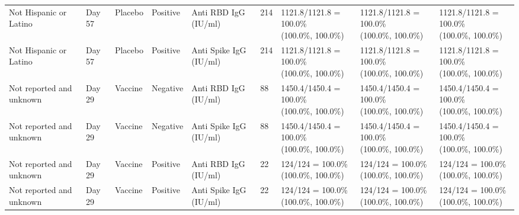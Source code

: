 \documentclass[]{book}
\theoremstyle{definition}
\theoremstyle{definition}
\theoremstyle{definition}
\newcommand{\1}{\mathbbm{1}}
\begin{document}
\begin{landscape}
\begin{ThreePartTable}
\begin{longtable}[t]{>{\raggedright\arraybackslash}p{2.7cm}llllllll}
\hspace{1em}Not Hispanic or Latino & Day 57 & Placebo & Positive & Anti RBD IgG (IU/ml) & 214 & \makecell[l]{1121.8/1121.8 = 100.0\%\\(100.0\%, 100.0\%)} & \makecell[l]{1121.8/1121.8 = 100.0\%\\(100.0\%, 100.0\%)} & \makecell[l]{1121.8/1121.8 = 100.0\%\\(100.0\%, 100.0\%)}\\
\hspace{1em}Not Hispanic or Latino & Day 57 & Placebo & Positive & Anti Spike IgG (IU/ml) & 214 & \makecell[l]{1121.8/1121.8 = 100.0\%\\(100.0\%, 100.0\%)} & \makecell[l]{1121.8/1121.8 = 100.0\%\\(100.0\%, 100.0\%)} & \makecell[l]{1121.8/1121.8 = 100.0\%\\(100.0\%, 100.0\%)}\\
\hspace{1em}Not reported and unknown & Day 29 & Vaccine & Negative & Anti RBD IgG (IU/ml) & 88 & \makecell[l]{1450.4/1450.4 = 100.0\%\\(100.0\%, 100.0\%)} & \makecell[l]{1450.4/1450.4 = 100.0\%\\(100.0\%, 100.0\%)} & \makecell[l]{1450.4/1450.4 = 100.0\%\\(100.0\%, 100.0\%)}\\
\hspace{1em}Not reported and unknown & Day 29 & Vaccine & Negative & Anti Spike IgG (IU/ml) & 88 & \makecell[l]{1450.4/1450.4 = 100.0\%\\(100.0\%, 100.0\%)} & \makecell[l]{1450.4/1450.4 = 100.0\%\\(100.0\%, 100.0\%)} & \makecell[l]{1450.4/1450.4 = 100.0\%\\(100.0\%, 100.0\%)}\\
\hspace{1em}Not reported and unknown & Day 29 & Vaccine & Positive & Anti RBD IgG (IU/ml) & 22 & \makecell[l]{124/124 = 100.0\%\\(100.0\%, 100.0\%)} & \makecell[l]{124/124 = 100.0\%\\(100.0\%, 100.0\%)} & \makecell[l]{124/124 = 100.0\%\\(100.0\%, 100.0\%)}\\
\hspace{1em}Not reported and unknown & Day 29 & Vaccine & Positive & Anti Spike IgG (IU/ml) & 22 & \makecell[l]{124/124 = 100.0\%\\(100.0\%, 100.0\%)} & \makecell[l]{124/124 = 100.0\%\\(100.0\%, 100.0\%)} & \makecell[l]{124/124 = 100.0\%\\(100.0\%, 100.0\%)}\\

\end{longtable}
\end{ThreePartTable}
\end{landscape}
\end{document}
